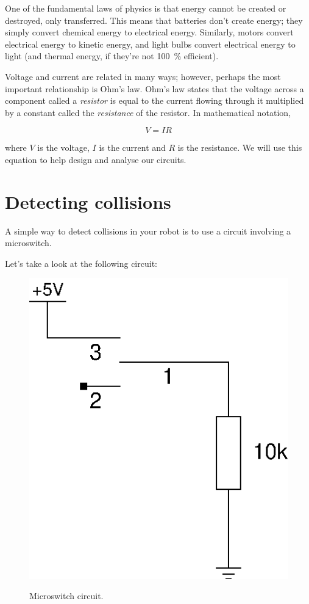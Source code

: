 \documentclass{article}
\begin{document}
One of the fundamental laws of physics is that energy cannot be created or
destroyed, only transferred. This means that batteries don't create energy;
they simply convert chemical energy to electrical energy. Similarly, motors
convert electrical energy to kinetic energy, and light bulbs convert electrical
energy to light (and thermal energy, if they're not \SI{100}{\percent}
efficient).

Voltage and current are related in many ways; however, perhaps the most
important relationship is Ohm's law. Ohm's law states that the voltage across
a component called a \emph{resistor} is equal to the current flowing through it
multiplied by a constant called the \emph{resistance} of the resistor. In
mathematical notation,

\begin{equation*}
V = I R
\end{equation*}

where $V$ is the voltage, $I$ is the current and $R$ is the resistance. We will
use this equation to help design and analyse our circuits.

\section{Detecting collisions}

A simple way to detect collisions in your robot is to use a circuit involving a
microswitch. 

Let's take a look at the following circuit:

\begin{figure}[h]
\centering
\includegraphics[width=.5\textwidth]{assets/fig/schem/switch}
\label{fig:schem:switch}
\caption{Microswitch circuit.}
\end{figure}
\end{document}

